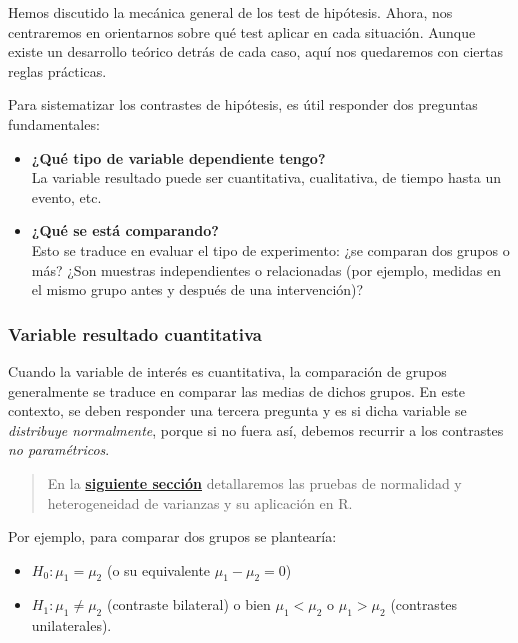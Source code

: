 \documentclass[
  spanish,
  a4paper,
]{scrbook}
\providecommand{\tightlist}{%
  \setlength{\itemsep}{0pt}\setlength{\parskip}{0pt}}
\begin{document}
Hemos discutido la mecánica general de los test de hipótesis. Ahora, nos
centraremos en orientarnos sobre qué test aplicar en cada situación.
Aunque existe un desarrollo teórico detrás de cada caso, aquí nos
quedaremos con ciertas reglas prácticas.

Para sistematizar los contrastes de hipótesis, es útil responder dos
preguntas fundamentales:

\begin{itemize}
\item
  \textbf{¿Qué tipo de variable dependiente tengo?}\\
  La variable resultado puede ser cuantitativa, cualitativa, de tiempo
  hasta un evento, etc.
\item
  \textbf{¿Qué se está comparando?}\\
  Esto se traduce en evaluar el tipo de experimento: ¿se comparan dos
  grupos o más? ¿Son muestras independientes o relacionadas (por
  ejemplo, medidas en el mismo grupo antes y después de una
  intervención)?
\end{itemize}

\subsubsection{Variable resultado
cuantitativa}\label{variable-resultado-cuantitativa}

Cuando la variable de interés es cuantitativa, la comparación de grupos
generalmente se traduce en comparar las medias de dichos grupos. En este
contexto, se deben responder una tercera pregunta y es si dicha variable
se \emph{distribuye normalmente}, porque si no fuera así, debemos
recurrir a los contrastes \emph{no paramétricos}.

\begin{quote}
En la \href{04_norm_het.qmd}{\textbf{siguiente sección}} detallaremos
las pruebas de normalidad y heterogeneidad de varianzas y su aplicación
en R.
\end{quote}

Por ejemplo, para comparar dos grupos se plantearía:

\begin{itemize}
\tightlist
\item
  \(H_0: \mu_1 = \mu_2\) (o su equivalente \(\mu_1 - \mu_2 = 0\))
\item
  \(H_1: \mu_1 \neq \mu_2\) (contraste bilateral) o bien
  \(\mu_1 < \mu_2\) o \(\mu_1 > \mu_2\) (contrastes unilaterales).
\end{itemize}
\end{document}
